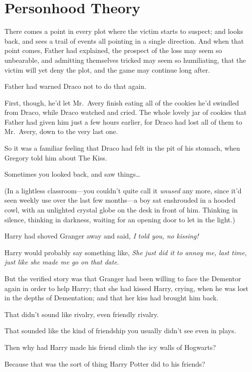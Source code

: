 \chapter{Personhood Theory}

There comes a point in every plot where the victim starts to suspect;
and looks back, and sees a trail of events all pointing in a single
direction. And when that point comes, Father had explained, the prospect
of the loss may seem so unbearable, and admitting themselves tricked may
seem so humiliating, that the victim will yet deny the plot, and the
game may continue long after.

Father had warned Draco not to do that again.

First, though, he'd let Mr.~Avery finish eating all of the cookies he'd
swindled from Draco, while Draco watched and cried. The whole lovely jar
of cookies that Father had given him just a few hours earlier, for Draco
had lost all of them to Mr.~Avery, down to the very last one.

So it was a familiar feeling that Draco had felt in the pit of his
stomach, when Gregory told him about The Kiss.

Sometimes you looked back, and saw things\ldots{}

(In a lightless classroom---you couldn't quite call it \emph{unused} any
more, since it'd seen weekly use over the last few months---a boy sat
enshrouded in a hooded cowl, with an unlighted crystal globe on the desk
in front of him. Thinking in silence, thinking in darkness, waiting for
an opening door to let in the light.)

Harry had shoved Granger away and said, \emph{I told you, no kissing!}

Harry would probably say something like, \emph{She just did it to annoy
me, last time, just like she made me go on that date.}

But the verified story was that Granger had been willing to face the
Dementor again in order to help Harry; that she had kissed Harry,
crying, when he was lost in the depths of Dementation; and that her kiss
had brought him back.

That didn't sound like rivalry, even friendly rivalry.

That sounded like the kind of friendship you usually didn't see even in
plays.

Then why had Harry made his friend climb the icy walls of Hogwarts?

Because that was the sort of thing Harry Potter did to his friends?

